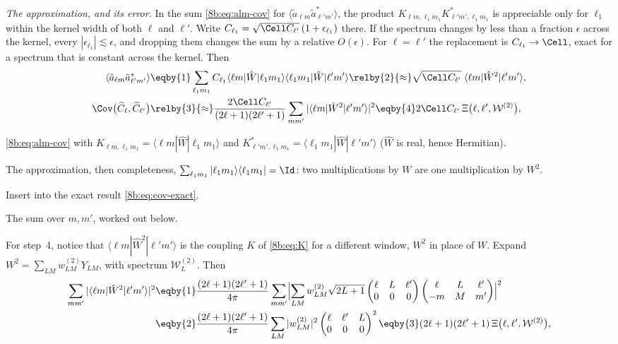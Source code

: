 \emph{The approximation, and its error.} In the sum \eqref{8b:eq:alm-cov} for $\langle\tilde a_{\ell m}\tilde a^*_{\ell'm'}\rangle$,
the product $K_{\ell m,\ell_1m_1}K^*_{\ell'm',\ell_1m_1}$ is appreciable only for $\ell_1$ within the kernel width of both
$\ell$ and $\ell'$. Write $C_{\ell_1}=\sqrt{\Cell C_{\ell'}}\,(1+\epsilon_{\ell_1})$ there. If the spectrum changes by less than a
fraction $\epsilon$ across the kernel, every $|\epsilon_{\ell_1}|\lesssim\epsilon$, and dropping them changes the sum by a
relative $O(\epsilon)$. For $\ell=\ell'$ the replacement is $C_{\ell_1}\to\Cell$, exact for a spectrum that is
constant across the kernel. Then
\begin{align}
  \langle\tilde a_{\ell m}\tilde a^*_{\ell'm'}\rangle
  &\eqby{1}\sum_{\ell_1m_1}C_{\ell_1}\langle\ell m|\hat W|\ell_1m_1\rangle\langle\ell_1m_1|\hat W|\ell'm'\rangle
   \relby{2}{\approx}\sqrt{\Cell C_{\ell'}}\;\langle\ell m|\hat W^2|\ell'm'\rangle , \nonumber\\
  \Cov\bigl(\widetilde C_\ell,\widetilde C_{\ell'}\bigr)
  &\relby{3}{\approx}\frac{2\Cell C_{\ell'}}{(2\ell+1)(2\ell'+1)}\sum_{mm'}|\langle\ell m|\hat W^2|\ell'm'\rangle|^2
   \eqby{4}2\Cell C_{\ell'}\,\Xi\bigl(\ell,\ell',\mathcal W^{(2)}\bigr),
  \label{8b:eq:efstathiou}
\end{align}
\begin{explain}
  \item \eqref{8b:eq:alm-cov} with $K_{\ell m,\ell_1m_1}=\langle\ell m|\hat W|\ell_1m_1\rangle$ and $K^*_{\ell'm',\ell_1m_1}=\langle\ell_1m_1|\hat W|\ell'm'\rangle$
        ($\hat W$ is real, hence Hermitian).
  \item The approximation, then completeness, $\sum_{\ell_1m_1}|\ell_1m_1\rangle\langle\ell_1m_1|=\Id$: two
        multiplications by $W$ are one multiplication by $W^2$.
  \item Insert into the exact result \eqref{8b:eq:cov-exact}.
  \item The sum over $m,m'$, worked out below.
\end{explain}
For step~4, notice that $\langle\ell m|\hat W^2|\ell'm'\rangle$ is the coupling $K$ of \eqref{8b:eq:K} for a different window,
$W^2$ in place of $W$. Expand $W^2=\sum_{LM}w^{(2)}_{LM}Y_{LM}$, with spectrum $\mathcal W^{(2)}_L$. Then
\begin{align*}
  \sum_{mm'}|\langle\ell m|\hat W^2|\ell'm'\rangle|^2
  &\eqby{1}\frac{(2\ell+1)(2\ell'+1)}{4\pi}\sum_{mm'}\Bigl|\sum_{LM}w^{(2)}_{LM}\sqrt{2L+1}
     \begin{pmatrix}\ell&L&\ell'\\0&0&0\end{pmatrix}\begin{pmatrix}\ell&L&\ell'\\-m&M&m'\end{pmatrix}\Bigr|^2\\
  &\eqby{2}\frac{(2\ell+1)(2\ell'+1)}{4\pi}\sum_{LM}|w^{(2)}_{LM}|^2\begin{pmatrix}\ell&\ell'&L\\0&0&0\end{pmatrix}^2
   \eqby{3}(2\ell+1)(2\ell'+1)\,\Xi\bigl(\ell,\ell',\mathcal W^{(2)}\bigr),
\end{align*}
